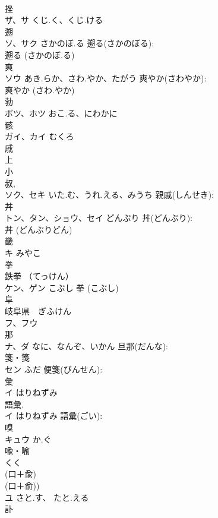 \documentclass[8pt]{extreport}
\begin{document}
\begin{CJK}{UTF8}{min}
\\	挫			
\\	ザ、サ	くじ.く、くじ.ける		
\\	遡			
\\	ソ、サク	さかのぼ.る	遡る(さかのぼる): 
\\	遡る (さかのぼ.る)
\\	爽			
\\	ソウ	あき.らか、さわ.やか、たがう	爽やか(さわやか): 
\\	爽やか (さわ.やか)
\\	勃			
\\	ボツ、ホツ	おこ.る、にわかに		
\\	骸			
\\	ガイ、カイ	むくろ		
\\	戚			
\\	上 
\\	小 
\\	叔, 
\\	ソク、セキ	いた.む、うれ.える、みうち	親戚(しんせき): 
\\	丼			
\\	トン、タン、ショウ、セイ	どんぶり	丼(どんぶり): 
\\	丼 (どんぶりどん)
\\	畿			
\\	キ	みやこ		
\\	拳			
\\	鉄拳 （てっけん） 
\\	ケン、ゲン	こぶし		拳 (こぶし)
\\	阜			
\\	岐阜県　ぎふけん 
\\	フ、フウ			
\\	那			
\\	ナ、ダ	なに、なんぞ、いかん	旦那(だんな): 
\\	箋・䇳			
\\	セン	ふだ	便箋(びんせん): 
\\	彙			
\\	イ はりねずみ 
\\	語彙.	
\\	イ	はりねずみ	語彙(ごい): 
\\	嗅				
\\	キュウ	か.ぐ		
\\	喩・喻				
\\	くく 
\\	(口＋兪) 
\\	(口＋俞)) 
\\	ユ	さと.す、 たと.える		
\\	訃				

\end{CJK}
\end{document}
